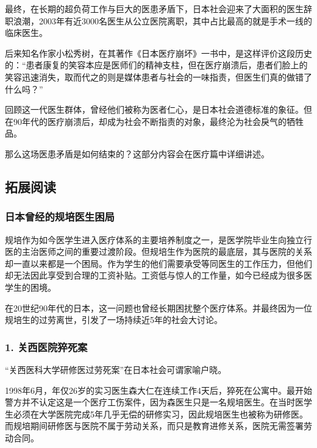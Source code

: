 最终，在长期的超负荷工作与巨大的医患矛盾下，日本社会迎来了大面积的医生辞职浪潮，2003年有近3000名医生从公立医院离职，其中占比最高的就是手术一线的临床医生。

后来知名作家小松秀树，在其著作《日本医疗崩坏》一书中，是这样评价这段历史的：“患者康复的笑容本应是医师们的精神支柱，但在医疗崩溃后，患者们脸上的笑容迅速消失，取而代之的则是媒体患者与社会的一味指责，但医生们真的做错了什么吗？”

回顾这一代医生群体，曾经他们被称为医者仁心，是日本社会道德标准的象征。但在90年代的医疗崩溃后，却成为社会不断指责的对象，最终沦为社会戾气的牺牲品。

那么这场医患矛盾是如何结束的？这部分内容会在医疗篇中详细讲述。

\subsection{拓展阅读}

\subsubsection{日本曾经的规培医生困局}

{\fangsong 规培作为如今医学生进入医疗体系的主要培养制度之一，是医学院毕业生向独立行医的主治医师之间的重要过渡阶段。但规培生作为医院的最底层，其与医院的关系却一直以来都是一个困局。作为学生的他们需要承受等同医生的工作压力，但他们却无法因此享受到合理的工资补贴。工资低与惊人的工作量，如今已经成为很多医学生的困境。\par}

{\fangsong 在20世纪90年代的日本，这一问题也曾经长期困扰整个医疗体系。并最终因为一位规培生的过劳离世，引发了一场持续近5年的社会大讨论。\par}

\subsubsection{1. 关西医院猝死案}

{\fangsong “关西医科大学研修医过劳死案”在日本社会可谓家喻户晓。\par}

{\fangsong 1998年6月，年仅26岁的实习医生森大仁在连续工作4天后，猝死在公寓中。最开始警方并不认定这是一个医疗工伤案件，因为森医生只是一名规培医生。在当时医学生必须在大学医院完成5年几乎无偿的研修实习，因此规培医生也被称为研修医。而规培期间研修医与医院不属于劳动关系，而只是教育进修关系，医院无需签署劳动合同。\par}

